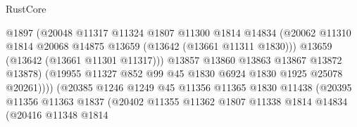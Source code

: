 \begin{lexlean}{RustCore}
\begin{coremodule}
                                        @1897
                                        (@20048
                                          @11317
                                          @11324
                                          @1807
                                          @11300
                                          @1814
                                          @14834
                                          (@20062
                                            @11310
                                            @1814
                                            @20068
                                            @14875
                                            @13659
                                            (@13642 (@13661 @11311 @1830)))
                                          @13659
                                          (@13642 (@13661 @11301 @11317)))
                                        @13857
                                        @13860
                                        @13863
                                        @13867
                                        @13872
                                        @13878)
                                      (@19955
                                        @11327
                                        @852
                                        @99
                                        @45
                                        @1830
                                        @6924
                                        @1830
                                        @1925
                                        @25078
                                        @20261))))
                                (@20385
                                  @1246
                                  @1249
                                  @45
                                  @11356
                                  @11365
                                  @1830
                                  @11438
                                  (@20395
                                    @11356
                                    @11363
                                    @1837
                                    (@20402
                                      @11355
                                      @11362
                                      @1807
                                      @11338
                                      @1814
                                      @14834
                                      (@20416
                                        @11348
                                        @1814

\end{coremodule}
\end{lexlean}
